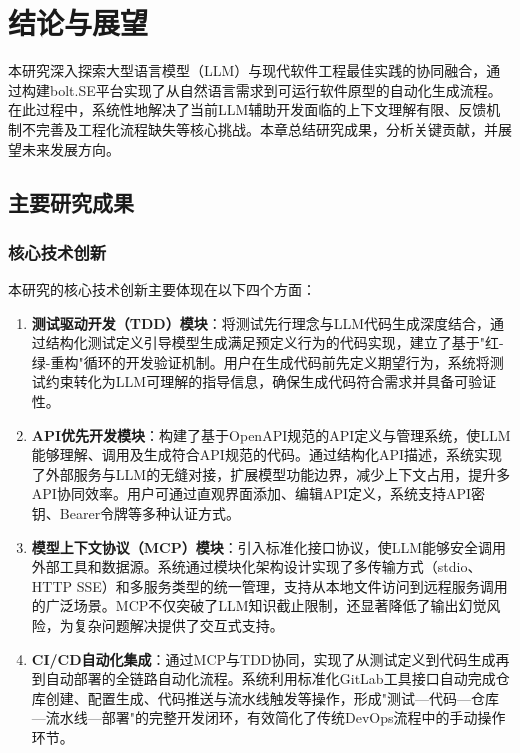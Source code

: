 
\chapter{结论与展望}

本研究深入探索大型语言模型（LLM）与现代软件工程最佳实践的协同融合，通过构建bolt.SE平台实现了从自然语言需求到可运行软件原型的自动化生成流程。在此过程中，系统性地解决了当前LLM辅助开发面临的上下文理解有限、反馈机制不完善及工程化流程缺失等核心挑战。本章总结研究成果，分析关键贡献，并展望未来发展方向。

\section{主要研究成果}

\subsection{核心技术创新}

本研究的核心技术创新主要体现在以下四个方面：

\begin{enumerate}
  \item \textbf{测试驱动开发（TDD）模块}：将测试先行理念与LLM代码生成深度结合，通过结构化测试定义引导模型生成满足预定义行为的代码实现，建立了基于"红-绿-重构"循环的开发验证机制。用户在生成代码前先定义期望行为，系统将测试约束转化为LLM可理解的指导信息，确保生成代码符合需求并具备可验证性。
  
  \item \textbf{API优先开发模块}：构建了基于OpenAPI规范的API定义与管理系统，使LLM能够理解、调用及生成符合API规范的代码。通过结构化API描述，系统实现了外部服务与LLM的无缝对接，扩展模型功能边界，减少上下文占用，提升多API协同效率。用户可通过直观界面添加、编辑API定义，系统支持API密钥、Bearer令牌等多种认证方式。
  
  \item \textbf{模型上下文协议（MCP）模块}：引入标准化接口协议，使LLM能够安全调用外部工具和数据源。系统通过模块化架构设计实现了多传输方式（stdio、HTTP SSE）和多服务类型的统一管理，支持从本地文件访问到远程服务调用的广泛场景。MCP不仅突破了LLM知识截止限制，还显著降低了输出幻觉风险，为复杂问题解决提供了交互式支持。
  
  \item \textbf{CI/CD自动化集成}：通过MCP与TDD协同，实现了从测试定义到代码生成再到自动部署的全链路自动化流程。系统利用标准化GitLab工具接口自动完成仓库创建、配置生成、代码推送与流水线触发等操作，形成"测试—代码—仓库—流水线—部署"的完整开发闭环，有效简化了传统DevOps流程中的手动操作环节。
\end{enumerate}


